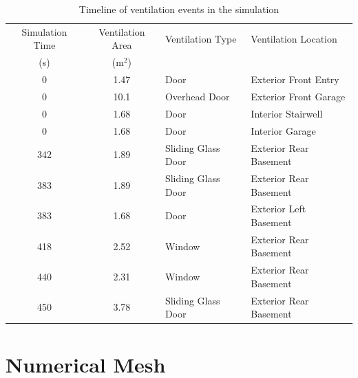 \documentclass[12pt,oneside]{book}
\begin{document}
\begin{table}[!ht]
\caption[Timeline of ventilation events in the simulation]
{Timeline of ventilation events in the simulation}
\begin{tabular}{ccll}
\toprule
Simulation Time      &  Ventilation Area  &  Ventilation Type    &  Ventilation Location     \\
{(s)}                &  (m$^2$)           &                      &                           \\
\midrule
0                    &  1.47              &  Door                &  Exterior Front Entry     \\
0                    &  10.1              &  Overhead Door       &  Exterior Front Garage    \\
0                    &  1.68              &  Door                &  Interior Stairwell       \\
0                    &  1.68              &  Door                &  Interior Garage          \\
342                  &  1.89              &  Sliding Glass Door  &  Exterior Rear Basement   \\
383                  &  1.89              &  Sliding Glass Door  &  Exterior Rear Basement   \\
383                  &  1.68              &  Door                &  Exterior Left Basement   \\
418                  &  2.52              &  Window              &  Exterior Rear Basement   \\
440                  &  2.31              &  Window              &  Exterior Rear Basement   \\
450                  &  3.78              &  Sliding Glass Door  &  Exterior Rear Basement   \\
\bottomrule
\end{tabular}
\label{tab:ventilation_timeline}
\end{table}

\section{Numerical Mesh}
\label{sec:numerical_mesh}
\end{document}
